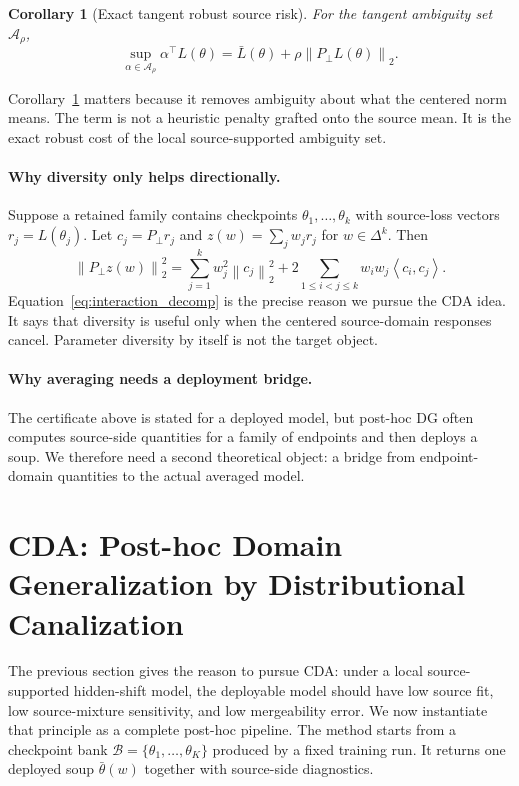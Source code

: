 \documentclass{article}
\newtheorem{corollary}[theorem]{Corollary}
\theoremstyle{definition}
\newcommand{\cA}{\mathcal{A}}
\newcommand{\cB}{\mathcal{B}}
\newcommand{\simplex}{\Delta}
\newcommand{\norm}[1]{\left\lVert #1 \right\rVert}
\newcommand{\inner}[2]{\left\langle #1, #2 \right\rangle}
\newcommand{\thetaw}{\bar{\theta}(w)}
\begin{document}
\begin{corollary}[Exact tangent robust source risk]
\label{cor:exact_robust}
For the tangent ambiguity set \(\cA_\rho\),
\begin{equation}
\sup_{\alpha \in \cA_\rho}\alpha^\top L(\theta)
=
\bar L(\theta)+\rho \norm{P_\perp L(\theta)}_2.
\label{eq:exact_robust}
\end{equation}
\end{corollary}

Corollary~\ref{cor:exact_robust} matters because it removes ambiguity about what the centered norm means. The term is not a heuristic penalty grafted onto the source mean. It is the exact robust cost of the local source-supported ambiguity set.

\paragraph{Why diversity only helps directionally.}
Suppose a retained family contains checkpoints \(\theta_1,\dots,\theta_k\) with source-loss vectors \(r_j=L(\theta_j)\). Let \(c_j=P_\perp r_j\) and \(z(w)=\sum_j w_j r_j\) for \(w \in \simplex^k\). Then
\begin{equation}
\norm{P_\perp z(w)}_2^2
=
\sum_{j=1}^k w_j^2\norm{c_j}_2^2
+ 2\sum_{1 \le i < j \le k} w_i w_j \inner{c_i}{c_j}.
\label{eq:interaction_decomp}
\end{equation}
Equation~\eqref{eq:interaction_decomp} is the precise reason we pursue the CDA idea. It says that diversity is useful only when the centered source-domain responses cancel. Parameter diversity by itself is not the target object.

\paragraph{Why averaging needs a deployment bridge.}
The certificate above is stated for a deployed model, but post-hoc DG often computes source-side quantities for a family of endpoints and then deploys a soup. We therefore need a second theoretical object: a bridge from endpoint-domain quantities to the actual averaged model.

\section{CDA: Post-hoc Domain Generalization by Distributional Canalization}
\label{sec:method}

The previous section gives the reason to pursue CDA: under a local source-supported hidden-shift model, the deployable model should have low source fit, low source-mixture sensitivity, and low mergeability error. We now instantiate that principle as a complete post-hoc pipeline. The method starts from a checkpoint bank \(\cB=\{\theta_1,\dots,\theta_K\}\) produced by a fixed training run. It returns one deployed soup \(\thetaw\) together with source-side diagnostics.
\end{document}
